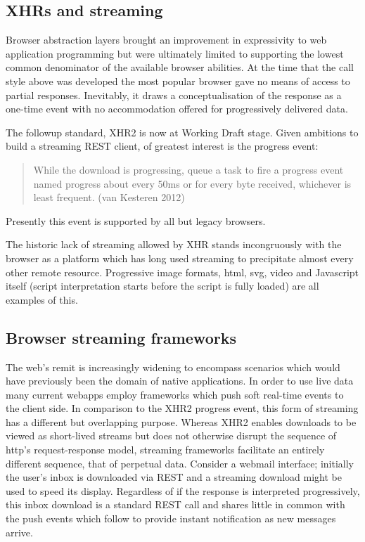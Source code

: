 \documentclass[]{article}
\begin{document}
\subsection{XHRs and streaming}

Browser abstraction layers brought an improvement in expressivity to web
application programming but were ultimately limited to supporting the
lowest common denominator of the available browser abilities. At the
time that the call style above was developed the most popular browser
gave no means of access to partial responses. Inevitably, it draws a
conceptualisation of the response as a one-time event with no
accommodation offered for progressively delivered data.

The followup standard, XHR2 is now at Working Draft stage. Given
ambitions to build a streaming REST client, of greatest interest is the
progress event:

\begin{quote}
While the download is progressing, queue a task to fire a progress event
named progress about every 50ms or for every byte received, whichever is
least frequent. (van Kesteren 2012)
\end{quote}

Presently this event is supported by all but legacy browsers.

The historic lack of streaming allowed by XHR stands incongruously with
the browser as a platform which has long used streaming to precipitate
almost every other remote resource. Progressive image formats, html,
svg, video and Javascript itself (script interpretation starts before
the script is fully loaded) are all examples of this.

\subsection{Browser streaming frameworks}

The web's remit is increasingly widening to encompass scenarios which
would have previously been the domain of native applications. In order
to use live data many current webapps employ frameworks which push soft
real-time events to the client side. In comparison to the XHR2 progress
event, this form of streaming has a different but overlapping purpose.
Whereas XHR2 enables downloads to be viewed as short-lived streams but
does not otherwise disrupt the sequence of http's request-response
model, streaming frameworks facilitate an entirely different sequence,
that of perpetual data. Consider a webmail interface; initially the
user's inbox is downloaded via REST and a streaming download might be
used to speed its display. Regardless of if the response is interpreted
progressively, this inbox download is a standard REST call and shares
little in common with the push events which follow to provide instant
notification as new messages arrive.
\end{document}
